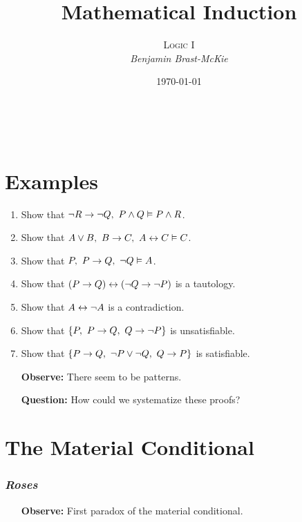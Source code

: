 \documentclass[a4paper, 11pt]{article} %
\title{\textbf{Mathematical Induction}} %
\author{\textsc{Logic I}\\ \em Benjamin Brast-McKie} %
\date{\today} %
\makeatletter
\renewcommand{\maketitle}{
\begin{flushright}
{\LARGE\@title}

\vspace{10pt}

{\@author}
\\ \@date
\end{flushright}

\vspace{-20pt}

}
\makeatother
\begin{document}
\maketitle %

\thispagestyle{empty}


\section*{Examples}

\begin{enumerate}
  \item Show that $\neg R \rightarrow \neg Q,\ P \wedge Q \vDash P \wedge R$.
  \item Show that $A \vee B,\ B \rightarrow C,\ A \leftrightarrow C \vDash C$.
  \item Show that $P,\ P \rightarrow Q,\ \neg Q \vDash A$.
  \item Show that $(P \rightarrow Q) \leftrightarrow (\neg Q \rightarrow \neg P)$ is a tautology.
  \item Show that $A \leftrightarrow \neg A$ is a contradiction.
  \item Show that $\{P,\ P \rightarrow Q,\ Q \rightarrow \neg P\}$ is unsatisfiable. 
  \item Show that $\lbrace P \rightarrow Q,\ \neg P \vee \neg Q,\ Q \rightarrow P\rbrace$ is satisfiable.
  \item[\bf Observe:] There seem to be patterns.
  \item[\bf Question:] How could we systematize these proofs?
\end{enumerate}


\section*{The Material Conditional}

\subsubsection*{\it \textbf{Roses}}

\begin{earg}
\end{earg}


\begin{itemize}[leftmargin=1in,labelsep=.15in] %
  \item[\bf Observe:] First paradox of the material conditional.
\end{itemize}
\end{document}
